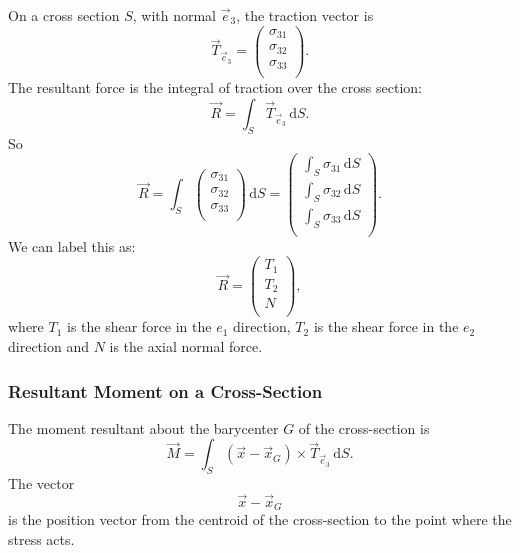 On a cross section $S$, with normal $\Vec{e}_3$, the traction vector is
\begin{equation*}
  \Vec{T}_{\Vec{e}_3} = \begin{pmatrix}
    \sigma_{31}\\
  \sigma_{32}\\
  \sigma_{33}\\
  \end{pmatrix}
.\end{equation*}
The resultant force is the integral of traction over the cross section:
\begin{equation*}
  \Vec{R} = \int_{S} \Vec{T}_{\Vec{e}_3} \, \mathrm{d}S
.\end{equation*}
So
\begin{equation*}
  \Vec{R} = \int_S \begin{pmatrix}
    \sigma_{31}\\
  \sigma_{32}\\
  \sigma_{33}\\
  \end{pmatrix} \, \mathrm{d}S = \begin{pmatrix}
    \int_S \sigma_{31} \, \mathrm{d}S\\
  \int_S \sigma_{32} \, \mathrm{d}S\\
  \int_S \sigma_{33} \, \mathrm{d}S\\
  \end{pmatrix}
.\end{equation*}
We can label this as:
\begin{equation*}
  \Vec{R} = \begin{pmatrix}
    T_1\\
  T_2\\
  N\\
  \end{pmatrix}
,\end{equation*}
where $T_1$ is the shear force in the $e_1$ direction, $T_2$ is the shear force in the $e_2$ direction and $N$ is the axial normal force.


\subsubsection{Resultant Moment on a Cross-Section}
The moment resultant about the barycenter $G$  of the cross-section is
\begin{equation*}
  \Vec{M} = \int_S \left( \Vec{x} - \Vec{x}_G \right) \times \Vec{T}_{\Vec{e}_3} \, \mathrm{d}S
.\end{equation*}
The vector
\begin{equation*}
  \Vec{x} - \Vec{x}_G
\end{equation*}
is the position vector from the centroid of the cross-section to the point where the stress acts.

